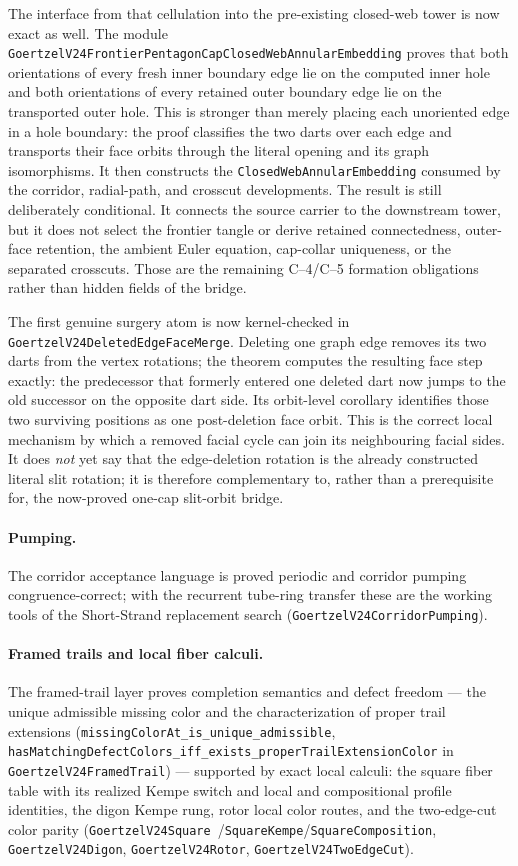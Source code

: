 \documentclass[11pt]{article}
\theoremstyle{definition}
\begin{document}
The interface from that cellulation into the pre-existing closed-web tower is
now exact as well.  The module
\texttt{GoertzelV24FrontierPentagonCapClosedWebAnnularEmbedding} proves that
both orientations of every fresh inner boundary edge lie on the computed
inner hole and both orientations of every retained outer boundary edge lie on
the transported outer hole.  This is stronger than merely placing each
unoriented edge in a hole boundary: the proof classifies the two darts over
each edge and transports their face orbits through the literal opening and
its graph isomorphisms.  It then constructs the
\texttt{ClosedWebAnnularEmbedding} consumed by the corridor, radial-path, and
crosscut developments.  The result is still deliberately conditional.  It
connects the source carrier to the downstream tower, but it does not select
the frontier tangle or derive retained connectedness, outer-face retention,
the ambient Euler equation, cap-collar uniqueness, or the separated
crosscuts.  Those are the remaining C--4/C--5 formation obligations rather
than hidden fields of the bridge.

The first genuine surgery atom is now kernel-checked in
\texttt{GoertzelV24DeletedEdgeFaceMerge}.  Deleting one graph edge removes
its two darts from the vertex rotations; the theorem computes the resulting
face step exactly: the predecessor that formerly entered one deleted dart now
jumps to the old successor on the opposite dart side.  Its orbit-level
corollary identifies those two surviving positions as one post-deletion face
orbit.  This is the correct local mechanism by which a removed facial cycle
can join its neighbouring facial sides.  It does \emph{not} yet say that the
edge-deletion rotation is the already constructed literal slit rotation; it is
therefore complementary to, rather than a prerequisite for, the now-proved
one-cap slit-orbit bridge.

\paragraph{Pumping.} The corridor acceptance language is proved periodic and
corridor pumping congruence-correct; with the recurrent tube-ring transfer
these are the working tools of the Short-Strand replacement search
(\texttt{GoertzelV24CorridorPumping}).

\paragraph{Framed trails and local fiber calculi.} The framed-trail layer
proves completion semantics and defect freedom --- the unique admissible
missing color and the characterization of proper trail extensions
(\texttt{missingColorAt\_is\_unique\_admissible},
\texttt{hasMatchingDefectColors\_iff\_exists\_properTrailExtensionColor} in
\texttt{GoertzelV24FramedTrail}) --- supported by exact local calculi: the
square fiber table with its realized Kempe switch and local and
compositional profile identities, the digon Kempe rung, rotor local color
routes, and the two-edge-cut color parity (\texttt{GoertzelV24Square}\,%
/\texttt{SquareKempe}/\texttt{SquareComposition}, \texttt{GoertzelV24Digon},
\texttt{GoertzelV24Rotor}, \texttt{GoertzelV24TwoEdgeCut}).
\end{document}
